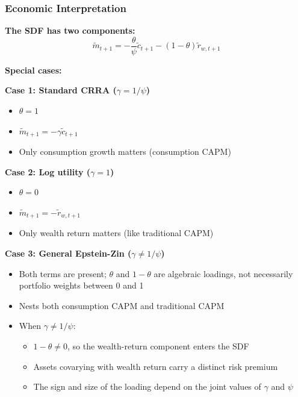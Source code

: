 \documentclass{beamer}
\begin{document}
\begin{frame}[allowframebreaks]
    \frametitle{Economic Interpretation}
    
    \textbf{The SDF has two components:}
    \begin{equation*}
        \tilde{m}_{t+1} = -\frac{\theta}{\psi} \tilde{c}_{t+1} - (1-\theta) \tilde{r}_{w,t+1}
    \end{equation*}

    \textbf{Special cases:}
    
    \textbf{Case 1: Standard CRRA ($\gamma = 1/\psi$)}
    \begin{itemize}
        \item $\theta = 1$
        \item $\tilde{m}_{t+1} = -\gamma\tilde{c}_{t+1}$
        \item Only consumption growth matters (consumption CAPM)
    \end{itemize}
    
    \textbf{Case 2: Log utility ($\gamma = 1$)}
    \begin{itemize}
        \item $\theta = 0$
        \item $\tilde{m}_{t+1} = -\tilde{r}_{w,t+1}$
        \item Only wealth return matters (like traditional CAPM)
    \end{itemize}
    
    \framebreak
    
    \textbf{Case 3: General Epstein-Zin ($\gamma \neq 1/\psi$)}
    \begin{itemize}
        \item Both terms are present; $\theta$ and $1-\theta$ are algebraic loadings, not necessarily portfolio weights between 0 and 1
        \item Nests both consumption CAPM and traditional CAPM
        \item When $\gamma \neq 1/\psi$:
        \begin{itemize}
            \item $1-\theta \neq 0$, so the wealth-return component enters the SDF
            \item Assets covarying with wealth return carry a distinct risk premium
            \item The sign and size of the loading depend on the joint values of $\gamma$ and $\psi$
        \end{itemize}
    \end{itemize}
 \end{frame}
\end{document}
